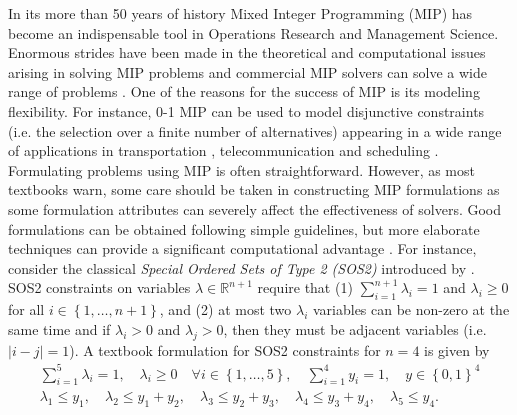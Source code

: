 \documentclass[mnsc]{informs3}
\newcommand{\set}[1]{\left\{#1\right\}}                     %
\newcommand{\abs}[1]{\left|#1\right|}                       %
\begin{document}



In its more than 50 years of history  Mixed Integer Programming (MIP) has become an indispensable tool in Operations Research and Management Science. Enormous strides have been made  in the theoretical and  computational issues arising in solving  MIP problems and commercial  MIP solvers  can  solve a wide range of problems  \citep{50book}. One of the reasons for the success of  MIP is its modeling flexibility. For instance, 0-1 MIP can be used to model disjunctive constraints (i.e. the selection over a finite number of alternatives) appearing in a wide range of applications in transportation \citep{croxton2003comparison,roberti2014fixed}, telecommunication \citep{d2013gub} and scheduling \citep{manne1960job,pinedo2012scheduling}. Formulating problems using MIP is often straightforward. However, as most textbooks warn, some care should be taken in constructing MIP formulations as some formulation attributes can severely affect the effectiveness of solvers. Good formulations can be obtained following simple guidelines, but more elaborate techniques can provide a significant computational advantage \citep{Mixed-Integer-Linear-Programming-Formulation-Techniques}. For instance, consider the classical \emph{Special Ordered Sets of Type 2 (SOS2)} introduced by  \cite{Beale70}. SOS2 constraints on variables $\lambda\in \mathbb{R}^{n+1}$ require that (1) $\sum\nolimits_{i=1}^{n+1} \lambda_i=1$ and $\lambda_i\geq 0$ for all $i\in \set{1,\ldots,n+1}$, and (2) at most two $\lambda_i$ variables can be non-zero at the same time and
if $\lambda_i>0$ and $\lambda_j>0$, then they must be adjacent variables (i.e. $\abs{i-j}=1$). A textbook formulation for SOS2 constraints for $n=4$ is given by 
\begin{subequations}\label{CC1d}
\begin{alignat}{3}
\sum\nolimits_{i=1}^5 \lambda_i=1,\quad \lambda_i \geq 0 \quad \forall i\in \set{1,\ldots,5}, \quad\sum\nolimits_{i=1}^4 y_i=1,\quad y\in \set{0,1}^4\\
\lambda_1 \leq y_1,\quad \lambda_2\leq y_1+y_2,\quad \lambda_3 \leq y_2+y_3,\quad \lambda_4\leq y_3+y_4,\quad \lambda_5\leq y_4.\label{CC1dg}
\end{alignat}
\end{subequations}
\end{document}
